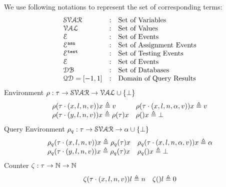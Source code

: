We use following notations to represent the set of corresponding terms:
\[
\begin{array}{lll}
\mathcal{SVAR} & : & \mbox{Set of Variables}  
\\ 
%
\mathcal{VAL} & : & \mbox{Set of Values} 
\\ 
%
%
\eventset  & : & \mbox{Set of Events}  
\\
%
%
\eventset^{\asn}  & : & \mbox{Set of Assignment Events}  
\\
%
\eventset^{\test}  & : & \mbox{Set of Testing Events}  
\\
%
%
\eventset  & : & \mbox{Set of Events}  
\\
%
\dbdom  & : & \mbox{{Set of Databases}} 
\\
%
\qdom = {[-1,1]} & : & \mbox{{Domain of Query Results}}
\end{array}
\]
%
%
%
Environment $ \rho : \mathtt{\tau} \to \mathcal{SVAR} \to \mathcal{VAL} \cup \{\bot\}$
\[
\begin{array}{ll}
\rho(\mathtt{\tau} \cdot (x, l, n, v)) x \triangleq v
&
\rho(\mathtt{\tau} \cdot (x, l, n, \alpha, v)) x \triangleq v
\\
\rho(\mathtt{\tau} \cdot (y, l, n, v)) x \triangleq \rho(\mathtt{\tau}) x
&
\rho() x \triangleq \bot
\end{array}
\]
%
%
Query Environment $\rho_{q}: \mathtt{\tau} \to \mathcal{SVAR} \to \alpha \cup \{\bot\}$
\[
\begin{array}{ll}
\rho_{q}(\mathtt{\tau} \cdot (x, l, n, v)) x \triangleq \rho_{q}(\mathtt{\tau}) x
&
\rho_{q}(\mathtt{\tau} \cdot (x, l, n, \alpha, v)) x \triangleq \alpha
\\
\rho_{q}(\mathtt{\tau} \cdot (y, l, n, v)) x \triangleq \rho_{q}(\mathtt{\tau}) x
&
\rho_{q}() x \triangleq \bot
\end{array}
\]
%
Counter $\mathtt{\zeta} : \mathtt{\tau} \to \mathbb{N} \to \mathbb{N}$
\[
\begin{array}{ll}
\mathtt{\zeta}(\mathtt{\tau} \cdot (x, l, n, v)) l \triangleq n
&
\mathtt{\zeta}() l \triangleq 0
\end{array}
\]
%
